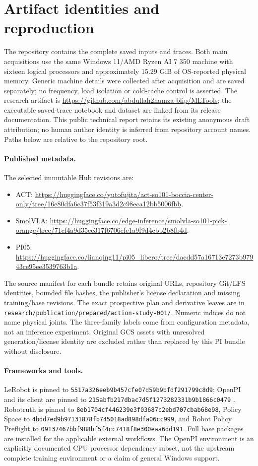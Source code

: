 \section{Artifact identities and reproduction}\label{app:artifacts}
The repository contains the complete saved inputs and traces. Both main acquisitions use the same Windows 11/AMD Ryzen AI 7 350 machine with sixteen logical processors and approximately 15.29 GiB of OS-reported physical memory. Generic machine details were collected after acquisition and are saved separately; no frequency, load isolation or cold-cache control is asserted. The research artifact is \url{https://github.com/abdullah2hamza-blip/MLTools}; the executable saved-trace notebook and dataset are linked from its release documentation. This public technical report retains its existing anonymous draft attribution; no human author identity is inferred from repository account names. Paths below are relative to the repository root.

\paragraph{Published metadata.}
The selected immutable Hub revisions are:
\begin{itemize}
\item ACT: \url{https://huggingface.co/yutofujita/act-so101-boccia-center-only/tree/16e80dfa6c37f53f319a3d2c98eca12bb5006fbb}.
\item SmolVLA: \url{https://huggingface.co/edge-inference/smolvla-so101-pick-orange/tree/71cf4a9d35ce317f6706efe1a9f9d4cbb2b8fb4d}.
\item PI05: \url{https://huggingface.co/lianqing11/pi05_libero/tree/dacdd57a16713e7273b97943ce95ee3539763b1a}.
\end{itemize}
The source manifest for each bundle retains original URLs, repository Git/LFS identities, bounded file hashes, the publisher's license declaration and missing training/base revisions. The exact prospective plan and derivative leaves are in \texttt{research/publication/prepared/action-study-001/}. Numeric indices do not name physical joints. The three-family labels come from configuration metadata, not an inference experiment. Original GCS assets with unresolved generation/license identity are excluded rather than replaced by this PI bundle without disclosure.

\paragraph{Frameworks and tools.}
LeRobot is pinned to \texttt{5517a326eeb9b457cfe07d59b9bfdf291799c8d9}; OpenPI and its client are pinned to \texttt{215abfb217dbac7d5f1273282331b9b1866c0479} \citep{lerobotcode,openpicode}. Robotruth is pinned to \texttt{8eb1704cf446239e3f03687c2ebd707cbab68e98}, Policy Space to \texttt{4bdd7ed9b97131878fb745018ad898dfa06cc999}, and Robot Policy Preflight to \texttt{09137467bbf988bf5f4cc7418f8e300eaa6dd191}. Full base packages are installed for the applicable external workflows. The OpenPI environment is an explicitly documented CPU processor dependency subset, not the upstream complete training environment or a claim of general Windows support.

